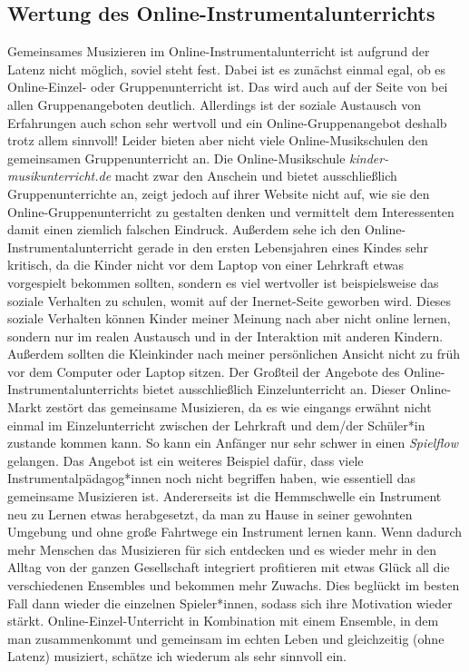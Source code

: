 \subsection{Wertung des Online-Instrumentalunterrichts}
Gemeinsames Musizieren im Online-Instrumentalunterricht ist aufgrund der Latenz
nicht möglich, soviel steht fest. Dabei ist es zunächst einmal egal, ob es
Online-Einzel- oder Gruppenunterricht ist. Das wird auch auf der Seite von
\autocite{online_musikschule_mmo} bei allen Gruppenangeboten deutlich.
Allerdings ist der soziale Austausch von Erfahrungen auch schon sehr wertvoll
und ein Online-Gruppenangebot deshalb trotz allem sinnvoll! Leider bieten aber
nicht viele Online-Musikschulen den gemeinsamen Gruppenunterricht an. Die
Online-Musikschule \emph{kinder-musikunterricht.de} macht zwar den Anschein und
bietet ausschließlich Gruppenunterrichte an, zeigt jedoch auf ihrer Website
nicht auf, wie sie den Online-Gruppenunterricht zu gestalten denken und vermittelt
dem Interessenten damit einen ziemlich falschen Eindruck. Außerdem sehe ich den
Online-Instrumentalunterricht gerade in den ersten Lebensjahren eines Kindes
sehr kritisch, da die Kinder nicht vor dem Laptop von einer Lehrkraft etwas
vorgespielt bekommen sollten, sondern es viel wertvoller ist beispielsweise das
soziale Verhalten zu schulen, womit auf der Inernet-Seite geworben wird. Dieses
soziale Verhalten können Kinder meiner Meinung nach aber nicht online lernen,
sondern nur im realen Austausch und in der Interaktion mit anderen Kindern. 
Außerdem sollten die Kleinkinder nach meiner persönlichen Ansicht nicht zu früh
vor dem Computer oder Laptop sitzen. Der Großteil der Angebote des
Online-Instrumentalunterrichts bietet ausschließlich Einzelunterricht an. 
Dieser Online-Markt zestört das gemeinsame Musizieren, da es wie eingangs
erwähnt nicht einmal im Einzelunterricht zwischen der Lehrkraft und dem/der
Schüler*in zustande kommen kann. So kann ein Anfänger nur sehr schwer in einen
\emph{Spielflow} gelangen. Das Angebot ist ein weiteres Beispiel
dafür, dass viele Instrumentalpädagog*innen noch nicht begriffen haben, wie
essentiell das gemeinsame Musizieren ist. Andererseits ist die Hemmschwelle ein
Instrument neu zu Lernen etwas herabgesetzt, da man zu Hause in seiner gewohnten
Umgebung und ohne große Fahrtwege ein Instrument lernen kann. Wenn dadurch
mehr Menschen das Musizieren für sich entdecken und es wieder mehr in den Alltag
von der ganzen Gesellschaft
integriert profitieren mit etwas Glück all die verschiedenen
Ensembles und bekommen mehr Zuwachs. Dies beglückt im besten Fall dann wieder
die einzelnen Spieler*innen, sodass sich ihre Motivation wieder stärkt.
Online-Einzel-Unterricht in Kombination mit einem Ensemble, in dem man
zusammenkommt und gemeinsam im echten Leben und gleichzeitig (ohne Latenz)
musiziert, schätze ich wiederum als sehr sinnvoll ein. 

